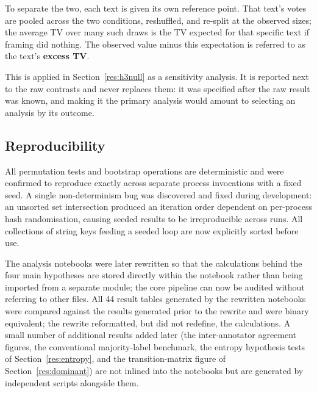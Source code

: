 To separate the two, each text is given its own reference point. That text's votes are
pooled across the two conditions, reshuffled, and re-split at the observed sizes; the average TV
over many such draws is the TV expected for that specific text if framing did nothing. The
observed value minus this expectation is referred to as the text's \textbf{excess TV}.

This is applied in Section~\ref{res:h3null} as a sensitivity analysis. It is reported next to the
raw contrasts and never replaces them: it was specified after the raw result was known, and
making it the primary analysis would amount to selecting an analysis by its outcome.

\subsection{Reproducibility}
\label{impl:repro}

\noindent
All permutation tests and bootstrap operations are deterministic and were confirmed to reproduce
exactly across separate process invocations with a fixed seed. A single non-determinism bug was
discovered and fixed during development: an unsorted set intersection produced an iteration order
dependent on per-process hash randomisation, causing seeded results to be irreproducible across
runs. All collections of string keys feeding a seeded loop are now explicitly sorted before use.

The analysis notebooks were later rewritten so that the calculations behind the four main
hypotheses are stored directly within the notebook rather than being imported from a separate
module; the core pipeline can now be audited without referring to other files. All 44 result tables
generated by the rewritten notebooks were compared against the results generated prior to the
rewrite and were binary equivalent; the rewrite reformatted, but did not redefine, the
calculations. A small number of additional results added later (the inter-annotator agreement
figures, the conventional majority-label benchmark, the entropy hypothesis tests of
Section~\ref{res:entropy}, and the transition-matrix figure of Section~\ref{res:dominant}) are not
inlined into the notebooks but are generated by independent scripts alongside them.
